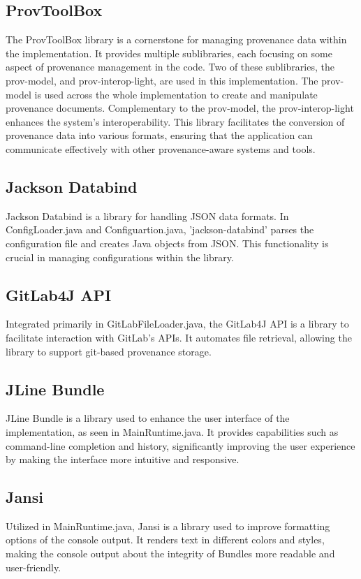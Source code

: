 \documentclass[
  digital,     %
  oneside,     %
  nosansbold,  %
  nocolorbold, %
  lof,         %
  lot,         %
]{fithesis4}
\begin{document}
\subsection{ProvToolBox}
The ProvToolBox library is a cornerstone for managing provenance data within the implementation. It provides multiple sublibraries, each focusing on some aspect of provenance management in the code. Two of these sublibraries, the prov-model, and prov-interop-light, are used in this implementation. The prov-model is used across the whole implementation to create and manipulate provenance documents. Complementary to the prov-model, the prov-interop-light enhances the system's interoperability. This library facilitates the conversion of provenance data into various formats, ensuring that the application can communicate effectively with other provenance-aware systems and tools.
\subsection{Jackson Databind}
Jackson Databind is a library for handling JSON data formats. In ConfigLoader.java and Configuartion.java, 'jackson-databind' parses the configuration file and creates Java objects from JSON. This functionality is crucial in managing configurations within the library.
\subsection{GitLab4J API}
Integrated primarily in GitLabFileLoader.java, the GitLab4J API is a library to facilitate interaction with GitLab's APIs. It automates file retrieval, allowing the library to support git-based provenance storage.
\subsection{JLine Bundle}
JLine Bundle is a library used to enhance the user interface of the implementation, as seen in MainRuntime.java. It provides capabilities such as command-line completion and history, significantly improving the user experience by making the interface more intuitive and responsive.
\subsection{Jansi}
Utilized in MainRuntime.java, Jansi is a library used to improve formatting options of the console output. It renders text in different colors and styles, making the console output about the integrity of Bundles more readable and user-friendly.
\end{document}
